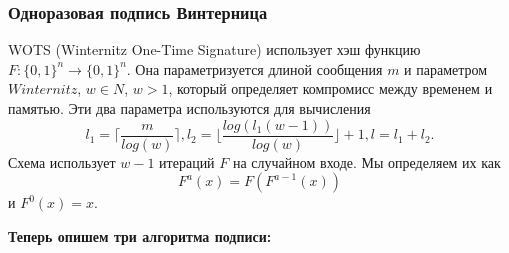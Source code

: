 \documentclass[a4paper, 14pt]{extarticle}
\begin{document}
\subsubsection{Одноразовая подпись Винтерница}
WOTS (Winternitz One-Time Signature) \cite{wots} использует хэш функцию $F : \{0, 1\}^{n} \rightarrow \{0, 1\}^{n}$. Она параметризуется длиной сообщения $m$ и параметром $Winternitz$, $w \in N$, $w > 1$, который определяет компромисс между временем и памятью. Эти два параметра используются для вычисления
\[ l_{1} = \Bigg \lceil \frac{m}{log(w)} \Bigg \rceil, l_{2} = \Bigg \lfloor \frac{log(l_{1}(w - 1))}{log(w)} \Bigg \rfloor + 1, l = l_{1} + l_{2}. \]
Схема использует $w - 1$ итераций $F$ на случайном входе. Мы определяем их как
\[ F^{a}(x) = F(F^{a - 1}(x)) \]
и $F^{0}(x) = x$.
\newline

\textbf{Теперь опишем три алгоритма подписи:}
\end{document}
